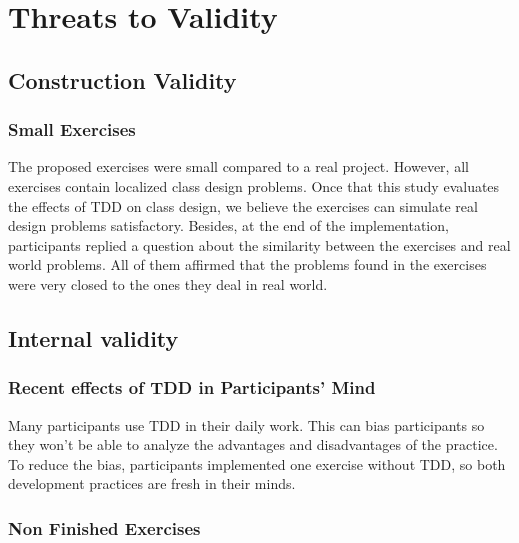\documentclass[times]{speauth}
\begin{document}
\section{Threats to Validity}
\label{cap:ameacas}

\subsection{Construction Validity}

\subsubsection{Small Exercises}

The proposed exercises were small compared to a real project. However, all exercises
contain localized class design problems. Once that this study evaluates the effects
of TDD on class design, we believe the exercises can simulate real design problems
satisfactory.
Besides, at the end of the implementation, participants replied a question about the
similarity between the exercises and real world problems. All of them affirmed that
the problems found in the exercises were very closed to the ones they deal in real world.

\subsection{Internal validity}

\subsubsection{Recent effects of TDD in Participants' Mind}

Many participants use TDD in their daily work. This can bias participants so they
won't be able to analyze the advantages and disadvantages of the practice.
To reduce the bias, participants implemented one exercise without TDD, so both
development practices are fresh in their minds.

\subsubsection{Non Finished Exercises}
\end{document}
